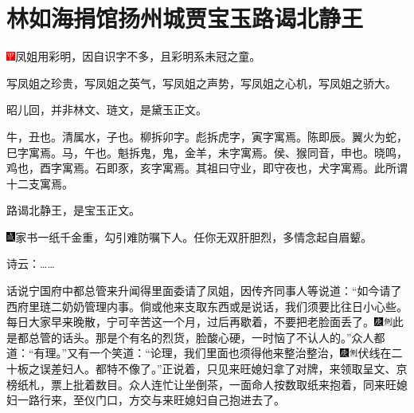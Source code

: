 

\chapter{林如海捐馆扬州城\hspace{.5em}贾宝玉路谒北静王}

{\includegraphics[width=3mm]{../Images/00002}凤姐用彩明，因自识字不多，且彩明系未冠之童。}

{写凤姐之珍贵，写凤姐之英气，写凤姐之声势，写凤姐之心机，写凤姐之骄大。}

{昭儿回，并非林文、琏文，是黛玉正文。}

{牛，丑也。清属水，子也。柳拆卯字。彪拆虎字，寅字寓焉。陈即辰。翼火为蛇，巳字寓焉。马，午也。魁拆鬼，鬼，金羊，未字寓焉。侯、猴同音，申也。晓鸣，鸡也，酉字寓焉。石即豕，亥字寓焉。其祖曰守业，即守夜也，犬字寓焉。此所谓十二支寓焉。}

{路谒北静王，是宝玉正文。}

{\includegraphics[width=3mm]{../Images/00005}家书一纸千金重，勾引难防嘱下人。任你无双肝胆烈，多情念起自眉颦。}

诗云：\ldots{}\ldots{}

话说宁国府中都总管来升闻得里面委请了凤姐，因传齐同事人等说道：``如今请了西府里琏二奶奶管理内事。倘或他来支取东西或是说话，我们须要比往日小心些。每日大家早来晚散，宁可辛苦这一个月，过后再歇着，不要把老脸面丢了。{\includegraphics[width=3mm]{../Images/00004}\includegraphics[width=3mm]{../Images/00011}\footnotesize \kaishu 此是都总管的话头。}那是个有名的烈货，脸酸心硬，一时恼了不认人的。''众人都道：``有理。''又有一个笑道：``论理，我们里面也须得他来整治整治，{\includegraphics[width=3mm]{../Images/00004}\includegraphics[width=3mm]{../Images/00011}\footnotesize \kaishu 伏线在二十板之误差妇人。}都特不像了。''正说着，只见来旺媳妇拿了对牌，来领取呈文、京榜纸札，票上批着数目。众人连忙让坐倒茶，一面命人按数取纸来抱着，同来旺媳妇一路行来，至仪门口，方交与来旺媳妇自己抱进去了。

